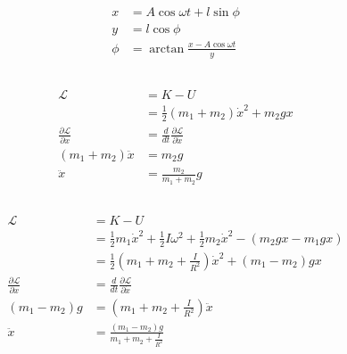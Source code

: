 \documentclass{article}
\begin{document}
\setcounter{subsection}{10}
\subsection{}

\begin{align*}
  x    & = A \cos \omega t + l \sin \phi         \\
  y    & = l \cos \phi                           \\
  \phi & = \arctan \frac{x - A \cos \omega t}{y}
\end{align*}

\setcounter{subsection}{14}
\subsection{}

\begin{align*}
  \mathcal{L}                             & = K - U                                                       \\
                                          & = \frac{1}{2} (m_1 + m_2) \dot{x}^2 + m_2 g x                 \\
  \frac{\partial \mathcal{L}}{\partial x} & = \frac{d}{d t} \frac{\partial \mathcal{L}}{\partial \dot{x}} \\
  (m_1 + m_2) \ddot{x}                    & = m_2 g                                                       \\
  \ddot{x}                                & = \frac{m_2}{m_1 + m_2} g
\end{align*}

\setcounter{subsection}{16}
\subsection{}

\begin{align*}
  \mathcal{L}                             & = K - U                                                                                                \\
                                          & = \frac{1}{2} m_1 \dot{x}^2 + \frac{1}{2} I \omega^2 + \frac{1}{2} m_2 \dot{x}^2 - (m_2 g x - m_1 g x) \\
                                          & = \frac{1}{2} \left( m_1 + m_2 + \frac{I}{R^2} \right) \dot{x}^2 + (m_1 - m_2) g x                     \\
  \frac{\partial \mathcal{L}}{\partial x} & = \frac{d}{d t} \frac{\partial \mathcal{L}}{\partial \dot{x}}                                          \\
  (m_1 - m_2) g                           & = \left( m_1 + m_2 + \frac{I}{R^2} \right) \ddot{x}                                                    \\
  \ddot{x}                                & = \frac{(m_1 - m_2) g}{m_1 + m_2 + \frac{I}{R^2}}
\end{align*}
\end{document}

